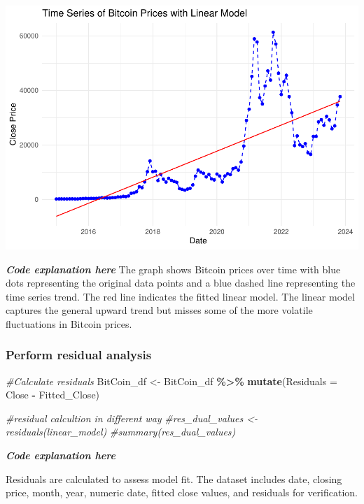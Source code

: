 \documentclass[
]{book}
\newenvironment{Shaded}{\begin{snugshade}}{\end{snugshade}}
\newcommand{\AttributeTok}[1]{\textcolor[rgb]{0.13,0.29,0.53}{#1}}
\newcommand{\CommentTok}[1]{\textcolor[rgb]{0.56,0.35,0.01}{\textit{#1}}}
\newcommand{\FunctionTok}[1]{\textcolor[rgb]{0.13,0.29,0.53}{\textbf{#1}}}
\newcommand{\NormalTok}[1]{#1}
\newcommand{\OtherTok}[1]{\textcolor[rgb]{0.56,0.35,0.01}{#1}}
\newcommand{\SpecialCharTok}[1]{\textcolor[rgb]{0.81,0.36,0.00}{\textbf{#1}}}
\begin{document}
\includegraphics{bookdown-demo_files/figure-latex/unnamed-chunk-19-1.pdf}

\emph{\textbf{Code explanation here}}
The graph shows Bitcoin prices over time with blue dots representing the original data points and a blue dashed line representing the time series trend. The red line indicates the fitted linear model. The linear model captures the general upward trend but misses some of the more volatile fluctuations in Bitcoin prices.

\subsubsection{Perform residual analysis}\label{perform-residual-analysis}

\begin{Shaded}
\begin{Highlighting}[]
\CommentTok{\#Calculate residuals}
\NormalTok{BitCoin\_df }\OtherTok{\textless{}{-}}\NormalTok{ BitCoin\_df }\SpecialCharTok{\%\textgreater{}\%}
\FunctionTok{mutate}\NormalTok{(}\AttributeTok{Residuals =}\NormalTok{ Close }\SpecialCharTok{{-}}\NormalTok{ Fitted\_Close)}

\CommentTok{\#residual calcultion in different way}
\CommentTok{\#res\_dual\_values \textless{}{-} residuals(linear\_model)}
\CommentTok{\#summary(res\_dual\_values)}
\end{Highlighting}
\end{Shaded}

\emph{\textbf{Code explanation here}}

Residuals are calculated to assess model fit. The dataset includes date, closing price, month, year, numeric date, fitted close values, and residuals for verification.
\end{document}
